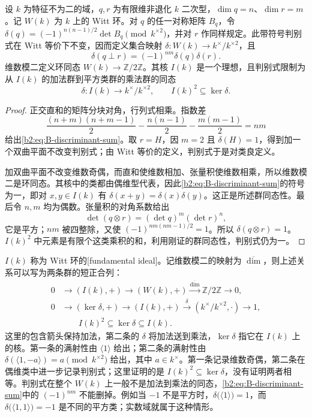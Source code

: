 \begin{proposition}\label{b2:prop:B-discriminant-witt}
	设 \(k\) 为特征不为二的域，\(q,r\) 为有限维非退化 \(k\) 二次型，\(\dim q=n\)、\(\dim r=m\)。记 \(W(k)\) 为 \(k\) 上的 Witt 环。对 \(q\) 的任一对称矩阵 \(B_q\)，令 \(\delta(q)=(-1)^{n(n-1)/2}\det B_q\pmod{k^{\times2}}\)，并对 \(r\) 作同样规定。此带符号判别式在 Witt 等价下不变，因而定义集合映射 \(\delta:W(k)\to k^\times/k^{\times2}\)，且
	\begin{equation}\label{b2:eq:B-discriminant-sum}
		\delta(q\perp r)=(-1)^{nm}\delta(q)\delta(r).
	\end{equation}
	维数模二定义环同态 \(W(k)\to\mathbb Z/2\mathbb Z\)。其核 \(I(k)\) 是一个理想，且判别式限制为从 \(I(k)\) 的加法群到平方类群的乘法群的同态
	\[
		\delta:I(k)\longrightarrow k^\times/k^{\times2}, \qquad I(k)^2\subseteq\ker\delta.
	\]
\end{proposition}
\begin{proof}
	正交直和的矩阵分块对角，行列式相乘。指数差
	\[
		\frac{(n+m)(n+m-1)}2-\frac{n(n-1)}2-\frac{m(m-1)}2=nm
	\]
	给出\eqref{b2:eq:B-discriminant-sum}。取 \(r=H\)，因 \(m=2\) 且 \(\delta(H)=1\)，得到加一个双曲平面不改变判别式；由 Witt 等价的定义，判别式于是对类良定义。

	加双曲平面不改变维数奇偶，而直和使维数相加、张量积使维数相乘，所以维数模二是环同态。其核中的类都由偶维型代表，因此\eqref{b2:eq:B-discriminant-sum}的符号为一，即对 \(x,y\in I(k)\) 有 \(\delta(x+y)=\delta(x)\delta(y)\)。这正是所述群同态性。最后令 \(n,m\) 均为偶数。张量积的对角系数给出
	\[
		\det(q\otimes r)=(\det q)^m(\det r)^n,
	\]
	它是平方；\(nm\) 被四整除，又使 \((-1)^{nm(nm-1)/2}=1\)。所以 \(\delta(q\otimes r)=1\)。\(I(k)^2\) 中元素是有限个这类乘积的和，利用刚证的群同态性，判别式仍为一。
\end{proof}

\(I(k)\) 称为 Witt 环的[fundamental ideal]。记维数模二的映射为 \(\overline{\dim}\)，则上述关系可以写为两条群的短正合列：
\[
	\begin{aligned}
		0&\longrightarrow(I(k),+)\longrightarrow(W(k),+) \xrightarrow{\overline{\dim}}\mathbb Z/2\mathbb Z\longrightarrow0,\\
		0&\longrightarrow(\ker\delta,+)\longrightarrow(I(k),+) \xrightarrow{\delta}(k^\times/k^{\times2},\cdot)\longrightarrow1,\\
		&\qquad I(k)^2\subseteq\ker\delta\subseteq I(k).
	\end{aligned}
\]
这里的包含箭头保持加法，第二条的 \(\delta\) 将加法送到乘法，\(\ker\delta\) 指它在 \(I(k)\) 上的核。第一条的满射性由 \(\langle1\rangle\) 给出；第二条的满射性由 \(\delta(\langle1,-a\rangle)=a\pmod{k^{\times2}}\) 给出，其中 \(a\in k^\times\)。第一条记录维数奇偶，第二条在偶维类中进一步记录判别式；这里证明的是 \(I(k)^2\subseteq\ker\delta\)，没有证明两者相等。判别式在整个 \(W(k)\) 上一般不是加法到乘法的同态，\eqref{b2:eq:B-discriminant-sum}中的 \((-1)^{nm}\) 不能删掉。例如当 \(-1\) 不是平方时，\(\delta\bigl(\langle1\rangle\bigr)=1\)，而 \(\delta\bigl(\langle1,1\rangle\bigr)=-1\) 是不同的平方类；实数域就属于这种情形。

